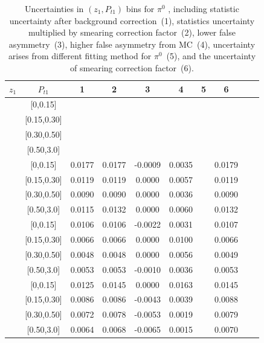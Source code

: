 \begin{table}[H]\scriptsize
\centering
\begin{tabular}{|c| c| c| c| c| c| c| c| c| c|}
\hline
$z_1$ & $P_{t1}$ & 1 & 2 & 3 & 4& 5& 6 \\ \hline
[0.2,0.3]	&	[0,0.15]	&		&		&		&		&		&		\\ \hline
[0.2,0.3]	&	[0.15,0.30]	&		&		&		&		&		&		\\ \hline
[0.2,0.3]	&	[0.30,0.50]	&		&		&		&		&		&		\\ \hline
[0.2,0.3]	&	[0.50,3.0]	&		&		&		&		&		&		\\ \hline
[0.3,0.5]	&	[0,0.15]	&	0.0177	&	0.0177	&	-0.0009	&	0.0035	&		&	0.0179	\\ \hline
[0.3,0.5]	&	[0.15,0.30]	&	0.0119	&	0.0119	&	0.0000	&	0.0057	&		&	0.0119	\\ \hline
[0.3,0.5]	&	[0.30,0.50]	&	0.0090	&	0.0090	&	0.0000	&	0.0036	&		&	0.0090	\\ \hline
[0.3,0.5]	&	[0.50,3.0]	&	0.0115	&	0.0132	&	0.0000	&	0.0060	&		&	0.0132	\\ \hline
[0.5,0.7]	&	[0,0.15]	&	0.0106	&	0.0106	&	-0.0022	&	0.0031	&		&	0.0107	\\ \hline
[0.5,0.7]	&	[0.15,0.30]	&	0.0066	&	0.0066	&	0.0000	&	0.0100	&		&	0.0066	\\ \hline
[0.5,0.7]	&	[0.30,0.50]	&	0.0048	&	0.0048	&	0.0000	&	0.0056	&		&	0.0049	\\ \hline
[0.5,0.7]	&	[0.50,3.0]	&	0.0053	&	0.0053	&	-0.0010	&	0.0036	&		&	0.0053	\\ \hline
[0.7,1.0]	&	[0,0.15]	&	0.0125	&	0.0145	&	0.0000	&	0.0163	&		&	0.0145	\\ \hline
[0.7,1.0]	&	[0.15,0.30]	&	0.0086	&	0.0086	&	-0.0043	&	0.0039	&		&	0.0088	\\ \hline
[0.7,1.0]	&	[0.30,0.50]	&	0.0072	&	0.0078	&	-0.0053	&	0.0019	&		&	0.0079	\\ \hline
[0.7,1.0]	&	[0.50,3.0]	&	0.0064	&	0.0068	&	-0.0065	&	0.0015	&		&	0.0070	\\ \hline
\end{tabular}
\caption{Uncertainties in $(z_1,P_{t1})$ bins for $\pi^0$ , including statistic uncertainty after background correction~(1), statistics uncertainty multiplied by smearing correction factor~(2), lower false asymmetry~(3), higher false asymmetry from MC~(4), uncertainty arises from different fitting method for $\pi^0$~(5), and the uncertainty of smearing correction factor~(6).}
\label{tab:etaerrors_zpt}
\end{table}

